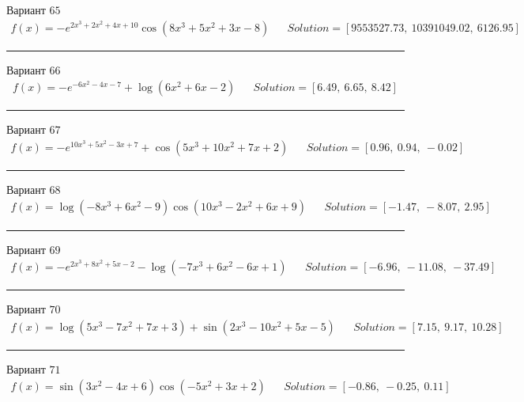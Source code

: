 \documentclass[11pt]{report}
\begin{document}
Вариант \(65\)
\begin{align*}
    f(x) = - e^{2 x^{3} + 2 x^{2} + 4 x + 10} \cos{\left(8 x^{3} + 5 x^{2} + 3 x - 8 \right)} && Solution = \left[ 9553527.73, \  10391049.02, \  6126.95\right]
\end{align*}
\begin{center}
    \noindent\rule{8cm}{0.4pt}
\end{center}
Вариант \(66\)
\begin{align*}
    f(x) = - e^{- 6 x^{2} - 4 x - 7} + \log{\left(6 x^{2} + 6 x - 2 \right)} && Solution = \left[ 6.49, \  6.65, \  8.42\right]
\end{align*}
\begin{center}
    \noindent\rule{8cm}{0.4pt}
\end{center}
Вариант \(67\)
\begin{align*}
    f(x) = - e^{10 x^{3} + 5 x^{2} - 3 x + 7} + \cos{\left(5 x^{3} + 10 x^{2} + 7 x + 2 \right)} && Solution = \left[ 0.96, \  0.94, \  -0.02\right]
\end{align*}
\begin{center}
    \noindent\rule{8cm}{0.4pt}
\end{center}
Вариант \(68\)
\begin{align*}
    f(x) = \log{\left(- 8 x^{3} + 6 x^{2} - 9 \right)} \cos{\left(10 x^{3} - 2 x^{2} + 6 x + 9 \right)} && Solution = \left[ -1.47, \  -8.07, \  2.95\right]
\end{align*}
\begin{center}
    \noindent\rule{8cm}{0.4pt}
\end{center}
Вариант \(69\)
\begin{align*}
    f(x) = - e^{2 x^{3} + 8 x^{2} + 5 x - 2} - \log{\left(- 7 x^{3} + 6 x^{2} - 6 x + 1 \right)} && Solution = \left[ -6.96, \  -11.08, \  -37.49\right]
\end{align*}
\begin{center}
    \noindent\rule{8cm}{0.4pt}
\end{center}
Вариант \(70\)
\begin{align*}
    f(x) = \log{\left(5 x^{3} - 7 x^{2} + 7 x + 3 \right)} + \sin{\left(2 x^{3} - 10 x^{2} + 5 x - 5 \right)} && Solution = \left[ 7.15, \  9.17, \  10.28\right]
\end{align*}
\begin{center}
    \noindent\rule{8cm}{0.4pt}
\end{center}
Вариант \(71\)
\begin{align*}
    f(x) = \sin{\left(3 x^{2} - 4 x + 6 \right)} \cos{\left(- 5 x^{2} + 3 x + 2 \right)} && Solution = \left[ -0.86, \  -0.25, \  0.11\right]
\end{align*}
\end{document}
